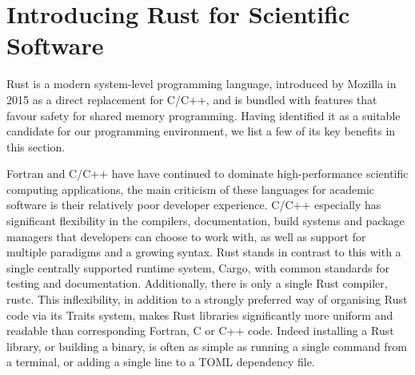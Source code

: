 \section{Introducing Rust for Scientific Software}\label{chpt:1:sec:2}

Rust is a modern system-level programming language, introduced by Mozilla in 2015 as a direct replacement for C/C++, and is bundled with features that favour safety for shared memory programming. Having identified it as a suitable candidate for our programming environment, we list a few of its key benefits in this section.

Fortran and C/C++ have have continued to dominate high-performance scientific computing applications, the main criticism of these languages for academic software is their relatively poor developer experience. C/C++ especially has significant flexibility in the compilers, documentation, build systems and package managers that developers can choose to work with, as well as support for multiple paradigms and a growing syntax. Rust stands in contrast to this with a single centrally supported runtime system, Cargo, with common standards for testing and documentation. Additionally, there is only a single Rust compiler, rustc. This inflexibility, in addition to a strongly preferred way of organising Rust code via its Traits system, makes Rust libraries significantly more uniform and readable than corresponding Fortran, C or C++ code. Indeed installing a Rust library, or building a binary, is often as simple as running a single command from a terminal, or adding a single line to a TOML dependency file.

